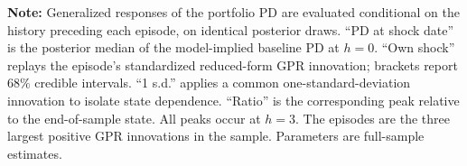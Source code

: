 \begin{table}[!htbp]
  \centering
  \scriptsize
  \tablestretch
  \compacttablecols
  \setlength{\tabcolsep}{4pt}
  \caption{\textbf{Geopolitical episodes evaluated at their own initial conditions.}}
  \label{tab:state_dependence}
  \par
  \medskip
  \begin{minipage}{\textwidth}
  \footnotesize
  \noindent \textbf{Note:} Generalized responses of the portfolio PD are
  evaluated conditional on the history preceding each episode, on identical
  posterior draws. ``PD at shock date'' is the posterior median of the
  model-implied baseline PD at $h=0$. ``Own shock'' replays the episode's
  standardized reduced-form GPR innovation; brackets report $68\%$ credible
  intervals. ``1 s.d.'' applies a common one-standard-deviation innovation to
  isolate state dependence. ``Ratio'' is the corresponding peak relative to the
  end-of-sample state. All peaks occur at $h=3$. The episodes are the three
  largest positive GPR innovations in the sample. Parameters are full-sample
  estimates.
  \end{minipage}
\end{table}
